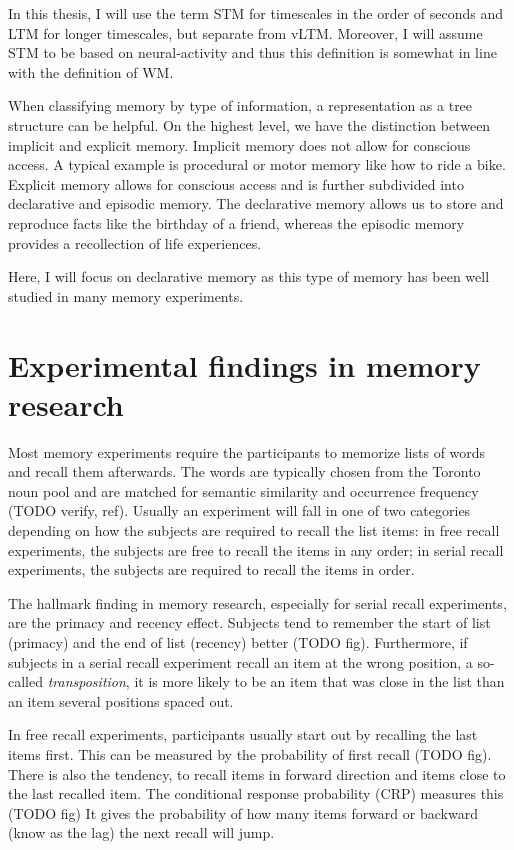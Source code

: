 In this thesis, I will use the term STM for timescales in the order of seconds and LTM for longer timescales, but separate from vLTM\@.
Moreover, I will assume STM to be based on neural-activity and thus this definition is somewhat in line with the definition of WM\@.

When classifying memory by type of information, a representation as a tree structure can be helpful.
On the highest level, we have the distinction between implicit and explicit memory.
Implicit memory does not allow for conscious access.
A typical example is procedural or motor memory like how to ride a bike.
Explicit memory allows for conscious access and is further subdivided into declarative and episodic memory.
The declarative memory allows us to store and reproduce facts like the birthday of a friend, whereas the episodic memory provides a recollection of life experiences.

Here, I will focus on declarative memory as this type of memory has been well studied in many memory experiments.


\section{Experimental findings in memory research}
Most memory experiments require the participants to memorize lists of words and recall them afterwards.
The words are typically chosen from the Toronto noun pool and are matched for semantic similarity and occurrence frequency (TODO verify, ref).
Usually an experiment will fall in one of two categories depending on how the subjects are required to recall the list items: in free recall experiments, the subjects are free to recall the items in any order; in serial recall experiments, the subjects are required to recall the items in order.

The hallmark finding in memory research, especially for serial recall experiments, are the primacy and recency effect.
Subjects tend to remember the start of list (primacy) and the end of list (recency) better (TODO fig).
Furthermore, if subjects in a serial recall experiment recall an item at the wrong position, a so-called \emph{transposition}, it is more likely to be an item that was close in the list than an item several positions spaced out.

In free recall experiments, participants usually start out by recalling the last items first.
This can be measured by the probability of first recall (TODO fig).
There is also the tendency, to recall items in forward direction and items close to the last recalled item.
The conditional response probability (CRP) measures this (TODO fig)
It gives the probability of how many items forward or backward (know as the lag) the next recall will jump.

